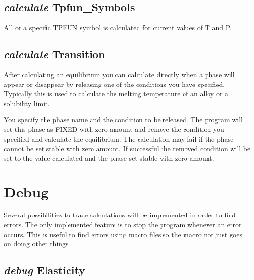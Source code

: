 \documentclass[12pt]{article}
\begin{document}
\subsection{{\em calculate} Tpfun\_Symbols}

All or a specific TPFUN symbol is calculated for current values of T
and P.

\subsection{{\em calculate} Transition}

After calculating an equilibrium you can calculate directly when a
phase will appear or disappear by releasing one of the conditions you
have specified.  Typically this is used to calculate the melting
temperature of an alloy or a solubility limit.  

You specify the phase name and the condition to be released.  The
program will set this phase as FIXED with zero amount and remove the
condition you specified and calculate the equilibrium.  The
calculation may fail if the phase cannot be set stable with zero
amount.  If successful the removed condition will be set to the value
calculated and the phase set stable with zero amount.

\section{Debug }

Several possibilities to trace calculations will be implemented in
order to find errors.  The only implemented feature is to stop the
program whenever an error occurs.  This is useful to find errors using
macro files so the macro not just goes on doing other things.

\subsection{{\em debug} Elasticity}
\end{document}
